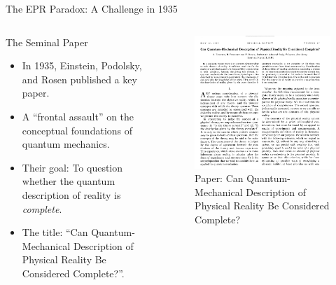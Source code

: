 \begin{frame}{The EPR Paradox: A Challenge in 1935}

  \begin{columns}
    \begin{column}{0.55\textwidth} %
      \begin{block}{The Seminal Paper}
        \begin{itemize}[<+->]
          \item In 1935, Einstein, Podolsky, and Rosen published a key paper.
          \item A ``frontal assault'' on the conceptual foundations of quantum mechanics.
          \item Their goal: To question whether the quantum description of reality is \emph{complete}.
          \item The title: ``Can Quantum-Mechanical Description of Physical Reality Be Considered Complete?''.
        \end{itemize}
      \end{block}
    \end{column}

    \begin{column}{0.45\textwidth} %
      \begin{center}
       \begin{figure}
        \centering
        \includegraphics[width=0.5\linewidth]{images/EPR-articulo.png}
        \caption{Paper: Can Quantum-Mechanical Description of Physical Reality Be Considered Complete? \cite{einstein_can_1935}}
      \end{figure}
      \end{center}
    \end{column}
  \end{columns}

\end{frame}

